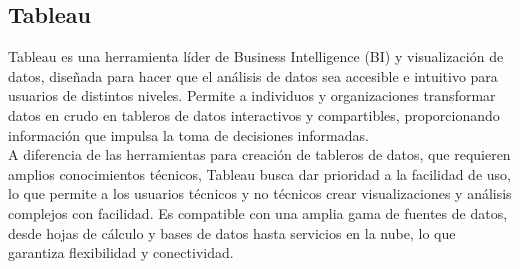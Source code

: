 \subsection{Tableau}
Tableau es una herramienta líder de Business Intelligence (BI) y visualización de datos, diseñada para hacer que el análisis de datos sea accesible e intuitivo para usuarios de distintos niveles. Permite a individuos y organizaciones transformar datos en crudo en tableros de datos interactivos y compartibles, proporcionando información que impulsa la toma de decisiones informadas.\\
A diferencia de las herramientas para creación de tableros de datos, que requieren amplios conocimientos técnicos, Tableau busca dar prioridad a la facilidad de uso, lo que permite a los usuarios técnicos y no técnicos crear visualizaciones y análisis complejos con facilidad. Es compatible con una amplia gama de fuentes de datos, desde hojas de cálculo y bases de datos hasta servicios en la nube, lo que garantiza flexibilidad y conectividad.\\



